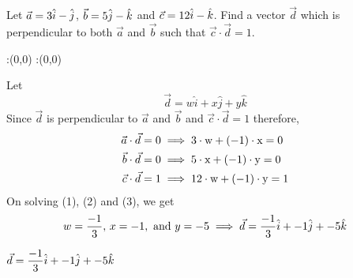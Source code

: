 


\question[2] Let $\vec{a}=3\hat{i}-\hat{j}$, $\vec{b}=5\hat{j}-\hat{k}$ 
and $\vec{c}=12\hat{i}-\hat{k}$. Find a vector $\vec{d}$ which is perpendicular
to both $\vec{a}$ and $\vec{b}$ such that $\vec{c}\cdot\vec{d}=1$.


\watchout

\ifprintanswers
  \begin{marginfigure}
      :(0,0)
      :(0,0)
    \figdrawbegin{}
      \figdrawline [100,101]
    \figdrawend
    \figvisu{\figBoxA}{}{%
    }
    \centerline{\box\figBoxA}
  \end{marginfigure}
\fi 

\begin{solution}[\halfpage]
Let \[ \vec{d}= w\hat{i}+x\hat{j}+y\hat{k} \]
Since $\vec{d}$ is perpendicular to $\vec{a}$ and $\vec{b}$ 
and $\vec{c}\cdot\vec{d}=1$ therefore,
\begin{align}
  \vec{a}\cdot\vec{d}&=0 \implies 3\cdot\text{w} + (-1)\cdot\text{x} = 0 \\
  \vec{b}\cdot\vec{d}&=0 \implies 5\cdot\text{x} + (-1)\cdot\text{y} = 0 \\
  \vec{c}\cdot\vec{d}&=1 \implies 12\cdot\text{w} + (-1)\cdot\text{y} = 1 
\end{align}
On solving (1), (2) and (3), we get 
\[ w = \dfrac{-1}{3},\, x = -1,\text{ and } y = -5 \implies \vec{d} = \dfrac{-1}{3}\hat{i}+-1\hat{j}+-5\hat{k} \] 

\end{solution}

\ifprintanswers
  \begin{codex}
    $\vec{d}=\dfrac{-1}{3}\hat{i} + -1\hat{j} + -5\hat{k}$
  \end{codex}
\fi
